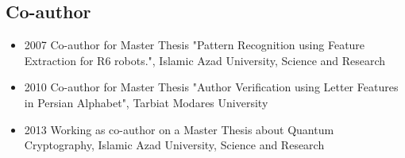 \documentclass[12pt,a4paper]{article}
\begin{document}
	\subsection{Co-author}
		\begin{itemize}
			\item 2007 Co-author for Master Thesis "Pattern Recognition using Feature Extraction for R6 robots.", Islamic Azad University, Science and Research
			\item 2010 Co-author for Master Thesis "Author Verification using Letter Features in Persian Alphabet", Tarbiat Modares University
			\item 2013 Working as co-author on a Master Thesis about Quantum Cryptography, Islamic Azad University, Science and Research
		\end{itemize}
		
\end{document}
